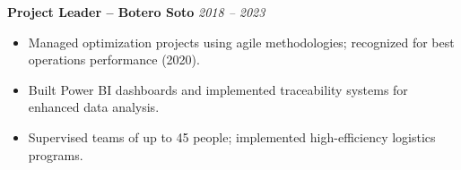 \vspace{0.1em}

\textbf{Project Leader – Botero Soto} \hfill \textit{2018 – 2023} \\[-0.6em]
\begin{itemize}[leftmargin=*]
    \item Managed optimization projects using agile methodologies; recognized for best operations performance (2020).
    \item Built Power BI dashboards and implemented traceability systems for enhanced data analysis.
    \item Supervised teams of up to 45 people; implemented high-efficiency logistics programs.
\end{itemize}